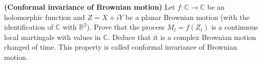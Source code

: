 \documentclass{article}
\newcommand{\tmtextbf}[1]{{\bfseries{#1}}}
\begin{document}
\hrulefill

\begin{exercise}
  [Pts 2] \tmtextbf{(Conformal invariance of Brownian motion)}\tmtextbf{} Let
  $f : \mathbb{C} \rightarrow \mathbb{C}$ be an holomorphic function and $Z =
  X + i Y$ be a planar Brownian motion (with the identification of
  $\mathbb{C}$ with $\mathbb{R}^2$). Prove that the process $M_t = f (Z_t)$ is
  a continuous local martingale with values in $\mathbb{C}$. Deduce that it is
  a complex Brownian motion changed of time. This property is called conformal
  invariance of Brownian motion. 
\end{exercise}

\

\hrulefill

\
\end{document}

